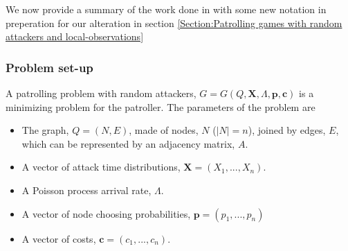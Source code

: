 \documentclass[a4paper,10pt]{article}
\theoremstyle{definition}
\theoremstyle{definition}
\theoremstyle{remark}
\theoremstyle{definition}
\begin{document}
We now provide a summary of the work done in \cite{Lin2013} with some new notation in preperation for our alteration in section \ref{Section:Patrolling games with random attackers and local-observations}

\subsubsection{Problem set-up}
A patrolling problem with random attackers, $G=G(Q,\bm{X},\Lambda,\bm{p},\bm{c})$ is a minimizing problem for the patroller. The parameters of the problem are

\begin{itemize}
\item The graph, $Q=(N,E)$, made of nodes, $N$ ($|N|=n$), joined by edges, $E$, which can be represented by an adjacency matrix, $A$.
\item A vector of attack time distributions, $\bm{X}=(X_{1},...,X_{n})$.
\item A Poisson process arrival rate, $\Lambda$.
\item A vector of node choosing probabilities, $\bm{p}=(p_{1},...,p_{n})$
\item A vector of costs, $\bm{c}=(c_{1},...,c_{n})$.
\end{itemize}
\end{document}
